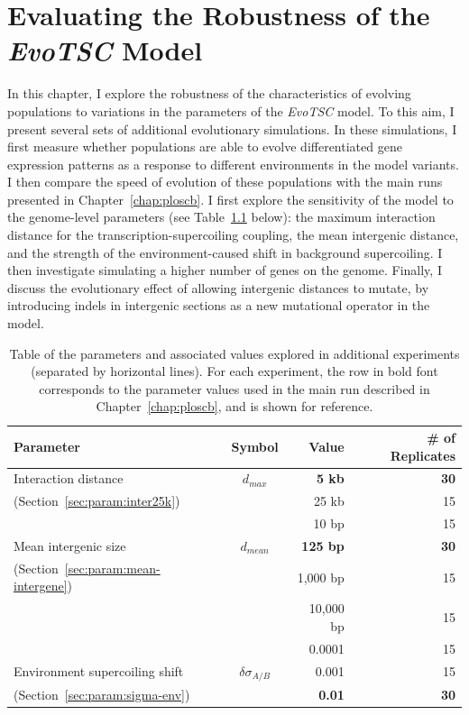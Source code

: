 \chapter{Evaluating the Robustness of the \emph{EvoTSC} Model}
\label{chap:param}

In this chapter, I explore the robustness of the characteristics of evolving populations to variations in the parameters of the \emph{EvoTSC} model.
To this aim, I present several sets of additional evolutionary simulations.
In these simulations, I first measure whether populations are able to evolve differentiated gene expression patterns as a response to different environments in the model variants.
I then compare the speed of evolution of these populations with the main runs presented in Chapter~\ref{chap:ploscb}.
I first explore the sensitivity of the model to the genome-level parameters (see Table~\ref{tab:param:params} below): the maximum interaction distance for the transcription-supercoiling coupling, the mean intergenic distance, and the strength of the environment-caused shift in background supercoiling.
I then investigate simulating a higher number of genes on the genome.
Finally, I discuss the evolutionary effect of allowing intergenic distances to mutate, by introducing indels in intergenic sections as a new mutational operator in the model.

\begin{table}[H]
\begin{center}
\begin{tabular}{l c r r}
\toprule
\textbf{Parameter} & \textbf{Symbol} & \textbf{Value} & \textbf{\# of Replicates} \\
\midrule
Interaction distance & $d_{max}$ & \textbf{5 kb} & \textbf{30}\\
(Section~\ref{sec:param:inter25k}) & & 25 kb & 15\\
\midrule
& & 10 bp& 15\\
Mean intergenic size & $d_{mean}$ & \textbf{125 bp} & \textbf{30} \\
(Section~\ref{sec:param:mean-intergene})& & 1,000 bp & 15\\
& & 10,000 bp & 15 \\
\midrule
& & 0.0001 & 15\\
Environment supercoiling shift & $\delta\sigma_{A/B}$ & 0.001 & 15\\
(Section~\ref{sec:param:sigma-env})& & \textbf{0.01} & \textbf{30}\\
\bottomrule
\end{tabular}
\end{center}
\caption[Table of parameter values explored in additional \emph{EvoTSC} simulations]{Table of the parameters and associated values explored in additional experiments (separated by horizontal lines).
For each experiment, the row in bold font corresponds to the parameter values used in the main run described in Chapter~\ref{chap:ploscb}, and is shown for reference.}
\label{tab:param:params}
\end{table}

